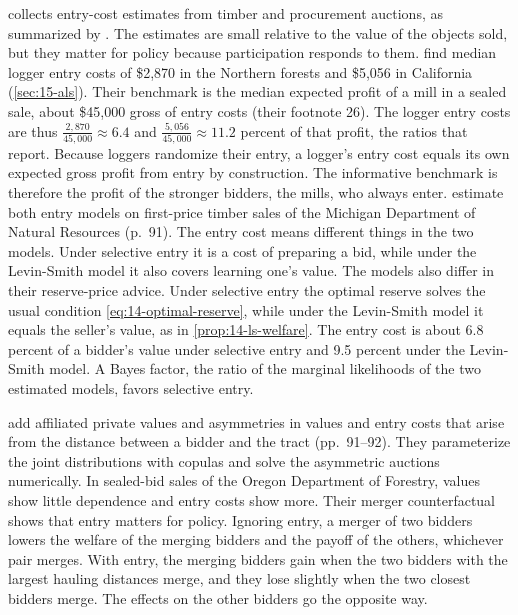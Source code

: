  collects entry-cost estimates from timber and procurement auctions, as
summarized by \citet[Sections 2.2, 2.6.3, 3.3 and 3.10]{HortacsuPerrigne2021}. The estimates are
small relative to the value of the objects sold, but they matter for policy because participation
responds to them. \citet{AtheyLevinSeira2011} find median logger entry costs of \$2,870 in the Northern forests and \$5,056 in
California (\cref{sec:15-als}). Their benchmark is the median expected profit of a mill in a sealed
sale, about \$45,000 gross of entry costs (their footnote 26). The logger entry costs are thus
$\frac{2{,}870}{45{,}000}\approx6.4$ and $\frac{5{,}056}{45{,}000}\approx11.2$ percent of that profit,
the ratios that \citet[p.~91]{HortacsuPerrigne2021} report. Because loggers randomize their entry, a logger's entry cost equals its own expected gross
profit from entry by construction. The informative benchmark is therefore the profit of the stronger
bidders, the mills, who always enter. \citet{LiZheng2012} estimate both entry models
on first-price timber sales of the Michigan Department of Natural Resources (p.~91). The entry cost
means different things in the two models. Under selective entry it is a cost of preparing a bid,
while under the Levin-Smith model it also covers learning one's value. The models also differ in
their reserve-price advice. Under selective entry the optimal reserve solves the usual condition
\eqref{eq:14-optimal-reserve}, while under the Levin-Smith model it equals the seller's value, as in
\cref{prop:14-ls-welfare}. The entry cost is about 6.8 percent of a bidder's value under selective
entry and 9.5 percent under the Levin-Smith model. A Bayes factor, the ratio of the marginal
likelihoods of the two estimated models, favors selective entry.

\citet{LiZhang2015} add affiliated private values and asymmetries in values and entry costs that
arise from the distance between a bidder and the tract (pp.~91--92). They parameterize the joint
distributions with copulas and solve the asymmetric auctions numerically. In sealed-bid sales of the
Oregon Department of Forestry, values show little dependence and entry costs show more. Their merger
counterfactual shows that entry matters for policy. Ignoring entry, a merger of two bidders lowers the
welfare of the merging bidders and the payoff of the others, whichever pair merges. With entry, the merging bidders gain when the two
bidders with the largest hauling distances merge, and they lose slightly when the two closest bidders
merge. The effects on the other bidders go the opposite way.

